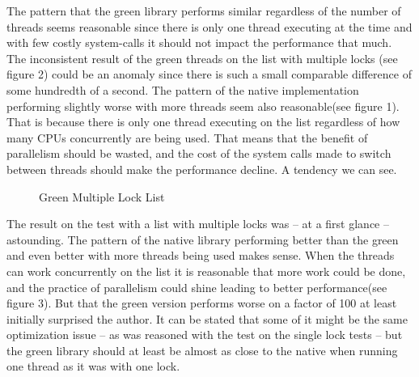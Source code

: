 \documentclass{article}
\begin{document}
The pattern that the green library performs similar regardless of the number of threads seems reasonable since there is only one thread executing at the time and with few costly system-calls it should not impact the performance that much. The inconsistent result of the green threads on the list with multiple locks (see figure 2) could be an anomaly since there is such a small comparable difference of some hundredth of a second. The pattern of the native implementation performing slightly worse with more threads seem also reasonable(see figure 1). That is because there is only one thread executing on the list regardless of how many CPUs concurrently are being used. That means that the benefit of parallelism should be wasted, and the cost of the system calls made to switch between threads should make the performance decline. A tendency we can see.

\begin{figure}
\hspace{4em}
\caption{Green Multiple Lock List}
\label{fig:gl}
\end{figure}

The result on the test with a list with multiple locks was – at a first glance – astounding. The pattern of the native library performing better than the green and even better with more threads being used makes sense. When the threads can work concurrently on the list it is reasonable that more work could be done, and the practice of parallelism could shine leading to better performance(see figure 3). But that the green version performs worse on a factor of 100 at least initially surprised the author. It can be stated that some of it might be the same optimization issue – as was reasoned with the test on the single lock tests – but the green library should at least be almost as close to the native when running one thread as it was with one lock. 
\end{document}

